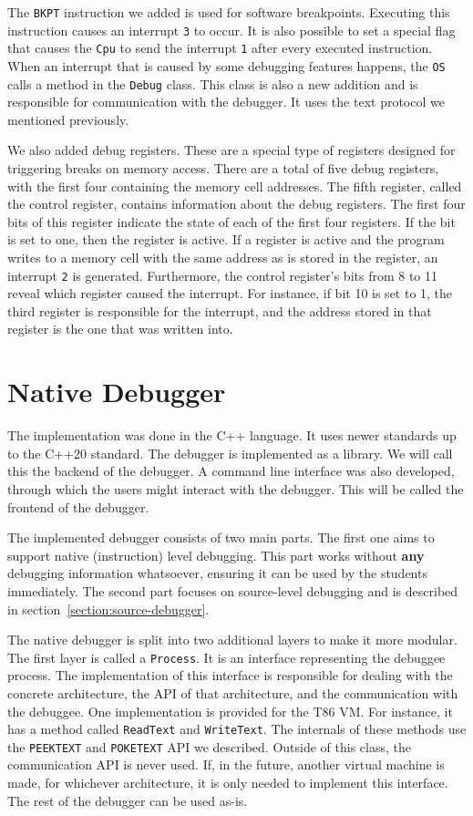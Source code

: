The \texttt{BKPT} instruction we added is used for software breakpoints.
Executing this instruction causes an interrupt \texttt{3} to occur. It is also
possible to set a special flag that causes the \texttt{Cpu} to send the
interrupt \texttt{1} after every executed instruction. When an interrupt that
is caused by some debugging features happens, the \texttt{OS} calls a method in
the \texttt{Debug} class. This class is also a new addition and is responsible
for communication with the debugger. It uses the text protocol we mentioned
previously.

We also added debug registers. These are a special type of registers designed
for triggering breaks on memory access. There are a total of five debug
registers, with the first four containing the memory cell addresses. The fifth
register, called the control register, contains information about the debug
registers. The first four bits of this register indicate the state of each of
the first four registers. If the bit is set to one, then the register is
active. If a register is active and the program writes to a memory cell with
the same address as is stored in the register, an interrupt \texttt{2} is
generated. Furthermore, the control register's bits from 8 to 11 reveal which
register caused the interrupt. For instance, if bit 10 is set to 1, the third
register is responsible for the interrupt, and the address stored in that
register is the one that was written into.

\section{Native Debugger}
The implementation was done in the C++ language. It uses newer standards up to
the C++20 standard. The debugger is implemented as a library. We will call this
the backend of the debugger. A command line interface was also developed,
through which the users might interact with the debugger. This will be called
the frontend of the debugger.

The implemented debugger consists of two main parts. The first one aims to
support native (instruction) level debugging. This part works without
\textbf{any} debugging information whatsoever, ensuring it can be used by the
students immediately. The second part focuses on source-level debugging and is
described in section~\ref{section:source-debugger}.

The native debugger is split into two additional layers to make it more
modular. The first layer is called a \texttt{Process}. It is an interface
representing the debuggee process. The implementation of this interface is
responsible for dealing with the concrete architecture, the API of that
architecture, and the communication with the debuggee. One implementation is
provided for the T86 VM. For instance, it has a method called \texttt{ReadText}
and \texttt{WriteText}. The internals of these methods use the
\texttt{PEEKTEXT} and \texttt{POKETEXT} API we described. Outside of this
class, the communication API is never used. If, in the future, another virtual
machine is made, for whichever architecture, it is only needed to implement
this interface. The rest of the debugger can be used as-is.


